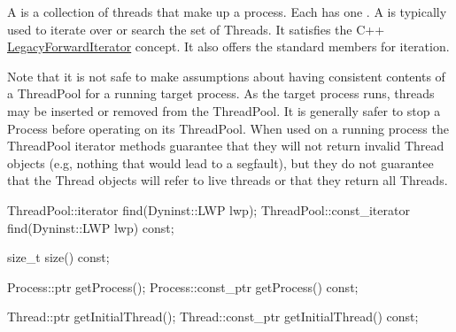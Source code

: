
A  is a collection of threads that make up a
process. Each  has one . A 
is typically used to iterate over or search the set of Threads. It satisfies the C++
\href{https://en.cppreference.com/cpp/named_req/ForwardIterator}{LegacyForwardIterator}
concept. It also offers the standard  members for iteration.

Note that it is not safe to make assumptions about having consistent contents of
a ThreadPool for a running target process. As the target process runs, threads
may be inserted or removed from the ThreadPool. It is generally safer
to stop a Process before operating on its ThreadPool. When used on a running
process the ThreadPool iterator methods guarantee that they will not return
invalid Thread objects (e.g, nothing that would lead to a segfault), but they
do not guarantee that the Thread objects will refer to live threads or that
they return all Threads.

\begin{apient}
ThreadPool::iterator find(Dyninst::LWP lwp);
ThreadPool::const_iterator find(Dyninst::LWP lwp) const;
\end{apient}


\begin{apient}
size_t size() const;
\end{apient}


\begin{apient}
Process::ptr getProcess();
Process::const_ptr getProcess() const;
\end{apient}


\begin{apient}
Thread::ptr getInitialThread();
Thread::const_ptr getInitialThread() const;
\end{apient}

